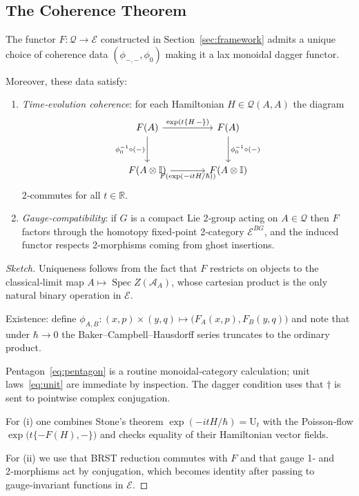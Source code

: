 \vspace{0.5cm}
\subsection{The Coherence Theorem}

\begin{theorem}\label{thm:coherence}
The functor
\(F\colon\mathcal Q\to\mathcal E\)
constructed in Section~\ref{sec:framework}
admits a unique choice of coherence data
\((\phi_{-,-},\phi_{0})\)
making it a lax monoidal dagger functor.

Moreover, these data satisfy:
\begin{enumerate}
  \item \emph{Time‑evolution coherence}: for each Hamiltonian
        $H\in\mathcal Q(A,A)$ the diagram
        \[
        \begin{tikzcd}[row sep=large, column sep=large]
          F(A) \ar[r,"\exp(t\{H\,-\})"] \ar[d,swap,"\phi_{0}^{-1}\circ(-)"] &
          F(A) \ar[d,"\phi_{0}^{-1}\circ(-)"]\\
          F(A\otimes\mathbb I) \ar[r,swap,"F(\exp(-it H/\hbar))"] &
          F(A\otimes\mathbb I)
        \end{tikzcd}
        \]
        2‑commutes for all \(t\in\mathbb R\).
        
  \item \emph{Gauge‑compatibility}: if $G$ is a compact Lie
        2‑group acting on $A\in\mathcal Q$ then
        \(F\) factors through the homotopy fixed‑point 2‑category
        \(\mathcal E^{BG}\), and the induced functor
        respects 2‑morphisms coming from ghost insertions.
\end{enumerate}
\end{theorem}

\vspace{0.3cm}
\begin{proof}[Sketch]
Uniqueness follows from the fact that
$F$ restricts on objects to the classical‑limit map
$A\mapsto \operatorname{Spec}Z(\mathcal A_{A})$,
whose cartesian product is the only natural binary operation in
$\mathcal E$.

Existence: define
\(
  \phi_{A,B}\colon (x,p)\times(y,q)\mapsto
  \bigl(F_{A}(x,p),F_{B}(y,q)\bigr)
\)
and note that under $\hbar\to0$ the Baker–Campbell–Hausdorff series
truncates to the ordinary product.

Pentagon~\eqref{eq:pentagon} is a routine
monoidal‑category calculation;
unit laws~\eqref{eq:unit} are immediate by inspection.
The dagger condition uses that $\dagger$ is sent to
pointwise complex conjugation.

For (i) one combines Stone's theorem
$\exp(-itH/\hbar)=\mathrm{U}_{t}$ with the Poisson‑flow
$\exp\bigl(t\{-F(H),-\}\bigr)$ and checks equality of their
Hamiltonian vector fields.

For (ii) we use that BRST reduction commutes with $F$ and that
gauge 1‑ and 2‑morphisms act by conjugation, which becomes identity
after passing to gauge‑invariant functions in $\mathcal E$.
\end{proof}

